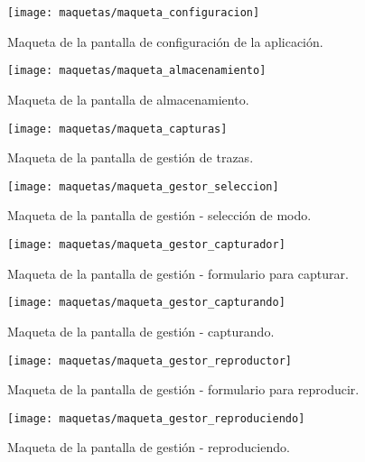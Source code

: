 \begin{figure}[!htp]
  \centering
  \texttt{[image: maquetas/maqueta\_configuracion]}
  \caption{Maqueta de la pantalla de configuración de la aplicación.}
  \label{fig:maqueta:configuracion}
\end{figure}

\begin{figure}[!htp]
  \centering
  \texttt{[image: maquetas/maqueta\_almacenamiento]}
  \caption{Maqueta de la pantalla de almacenamiento.}
  \label{fig:maqueta:almacenamiento}
\end{figure}

\begin{figure}[!htp]
  \centering
  \texttt{[image: maquetas/maqueta\_capturas]}
  \caption{Maqueta de la pantalla de gestión de \glspl{traza}.}
  \label{fig:maqueta:capturas}
\end{figure}

\begin{figure}[!htp]
  \centering
  \texttt{[image: maquetas/maqueta\_gestor\_seleccion]}
  \caption{Maqueta de la pantalla de gestión - selección de modo.}
  \label{fig:maqueta:gestor_seleccion}
\end{figure}

\begin{figure}[!htp]
  \centering
  \texttt{[image: maquetas/maqueta\_gestor\_capturador]}
  \caption{Maqueta de la pantalla de gestión - formulario para capturar.}
  \label{fig:maqueta:gestor_capturador}
\end{figure}

\begin{figure}[!htp]
  \centering
  \texttt{[image: maquetas/maqueta\_gestor\_capturando]}
  \caption{Maqueta de la pantalla de gestión - capturando.}
  \label{fig:maqueta:gestor_capturando}
\end{figure}

\begin{figure}[!htp]
  \centering
  \texttt{[image: maquetas/maqueta\_gestor\_reproductor]}
  \caption{Maqueta de la pantalla de gestión - formulario para reproducir.}
  \label{fig:maqueta:gestor_reproductor}
\end{figure}

\begin{figure}[!htp]
  \centering
  \texttt{[image: maquetas/maqueta\_gestor\_reproduciendo]}
  \caption{Maqueta de la pantalla de gestión - reproduciendo.}
  \label{fig:maqueta:gestor_reproduciendo}
\end{figure}